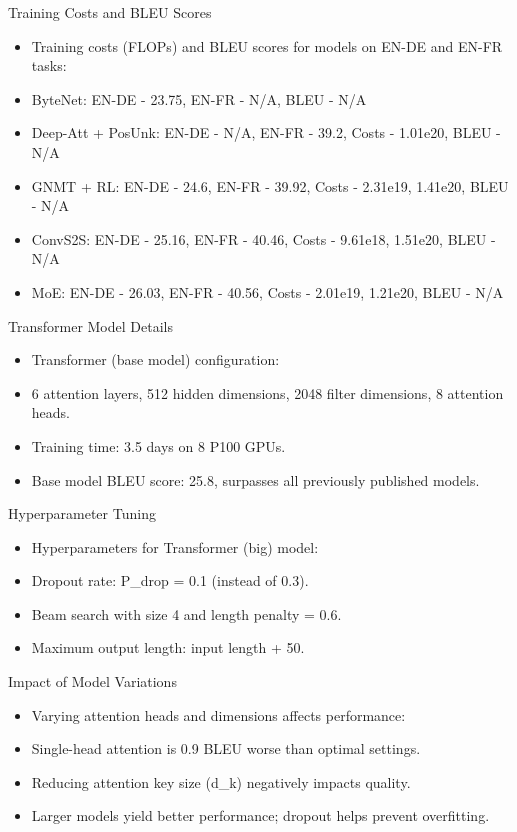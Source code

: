 \documentclass{beamer}
\begin{document}
\begin{frame}{Training Costs and BLEU Scores}
\begin{itemize}
\item Training costs (FLOPs) and BLEU scores for models on EN-DE and EN-FR tasks:
\item ByteNet: EN-DE - 23.75, EN-FR - N/A, BLEU - N/A
\item Deep-Att + PosUnk: EN-DE - N/A, EN-FR - 39.2, Costs - 1.01e20, BLEU - N/A
\item GNMT + RL: EN-DE - 24.6, EN-FR - 39.92, Costs - 2.31e19, 1.41e20, BLEU - N/A
\item ConvS2S: EN-DE - 25.16, EN-FR - 40.46, Costs - 9.61e18, 1.51e20, BLEU - N/A
\item MoE: EN-DE - 26.03, EN-FR - 40.56, Costs - 2.01e19, 1.21e20, BLEU - N/A
\end{itemize}
\end{frame}

\begin{frame}{Transformer Model Details}
\begin{itemize}
\item Transformer (base model) configuration:
\item 6 attention layers, 512 hidden dimensions, 2048 filter dimensions, 8 attention heads.
\item Training time: 3.5 days on 8 P100 GPUs.
\item Base model BLEU score: 25.8, surpasses all previously published models.
\end{itemize}
\end{frame}

\begin{frame}{Hyperparameter Tuning}
\begin{itemize}
\item Hyperparameters for Transformer (big) model:
\item Dropout rate: P_drop = 0.1 (instead of 0.3).
\item Beam search with size 4 and length penalty = 0.6.
\item Maximum output length: input length + 50.
\end{itemize}
\end{frame}

\begin{frame}{Impact of Model Variations}
\begin{itemize}
\item Varying attention heads and dimensions affects performance:
\item Single-head attention is 0.9 BLEU worse than optimal settings.
\item Reducing attention key size (d_k) negatively impacts quality.
\item Larger models yield better performance; dropout helps prevent overfitting.
\end{itemize}
\end{frame}
\end{document}
